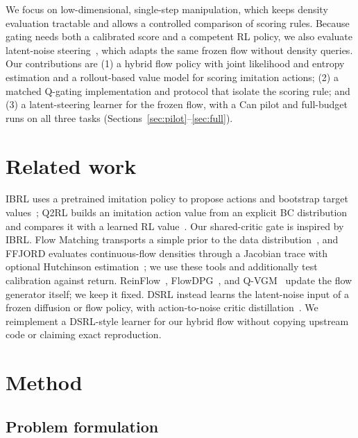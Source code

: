 \documentclass[10pt]{article}
\begin{document}
We focus on low-dimensional, single-step manipulation, which keeps density
evaluation tractable and allows a controlled comparison of scoring rules.
Because gating needs both a calibrated score and a competent RL policy, we also
evaluate latent-noise steering~\cite{wagenmaker2025dsrl}, which adapts the same
frozen flow without density queries. Our contributions are (1) a hybrid flow
policy with joint likelihood and entropy estimation and a rollout-based value
model for scoring imitation actions; (2) a matched Q-gating implementation and
protocol that isolate the scoring rule; and (3) a latent-steering learner for
the frozen flow, with a Can pilot and full-budget runs on all three tasks
(Sections~\ref{sec:pilot}--\ref{sec:full}).

\section{Related work}

IBRL uses a pretrained imitation policy to propose actions and bootstrap target
values~\cite{hu2024ibrl}; Q2RL builds an imitation action value from an explicit
BC distribution and compares it with a learned RL value~\cite{dodeja2026q2rl}.
Our shared-critic gate is inspired by IBRL. Flow Matching transports a simple
prior to the data distribution~\cite{lipman2022flow}, and FFJORD evaluates
continuous-flow densities through a Jacobian trace with optional Hutchinson
estimation~\cite{grathwohl2018ffjord}; we use these tools and additionally test
calibration against return. ReinFlow~\cite{zhang2025reinflow},
FlowDPG~\cite{shi2026flowdpg}, and Q-VGM~\cite{wang2026qvgm} update the flow
generator itself; we keep it fixed. DSRL instead learns the latent-noise input
of a frozen diffusion or flow policy, with action-to-noise critic
distillation~\cite{wagenmaker2025dsrl}. We reimplement a DSRL-style learner for
our hybrid flow without copying upstream code or claiming exact reproduction.

\section{Method}

\subsection{Problem formulation}
\end{document}
